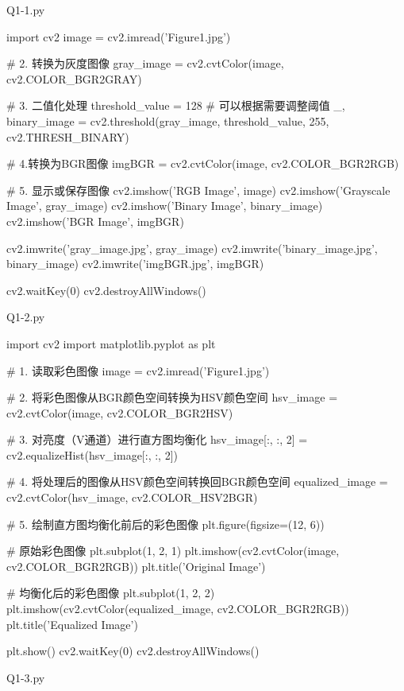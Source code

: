 \documentclass[11pt]{article}
\begin{document}
\begin{large}
    \noindent Q1-1.py
\end{large}
\begin{python}
import cv2
image = cv2.imread('Figure1.jpg')

# 2. 转换为灰度图像
gray_image = cv2.cvtColor(image, cv2.COLOR_BGR2GRAY)

# 3. 二值化处理
threshold_value = 128  # 可以根据需要调整阈值
_, binary_image = cv2.threshold(gray_image, threshold_value, 255, cv2.THRESH_BINARY)

# 4.转换为BGR图像
imgBGR = cv2.cvtColor(image, cv2.COLOR_BGR2RGB)


# 5. 显示或保存图像
cv2.imshow('RGB Image', image)
cv2.imshow('Grayscale Image', gray_image)
cv2.imshow('Binary Image', binary_image)
cv2.imshow('BGR Image', imgBGR)

cv2.imwrite('gray_image.jpg', gray_image)
cv2.imwrite('binary_image.jpg', binary_image)
cv2.imwrite('imgBGR.jpg', imgBGR)

cv2.waitKey(0)
cv2.destroyAllWindows()
\end{python}
\vspace*{1em}
\begin{large}
    \noindent Q1-2.py
\end{large}
\begin{python}
import cv2
import matplotlib.pyplot as plt

# 1. 读取彩色图像
image = cv2.imread('Figure1.jpg')

# 2. 将彩色图像从BGR颜色空间转换为HSV颜色空间
hsv_image = cv2.cvtColor(image, cv2.COLOR_BGR2HSV)

# 3. 对亮度（V通道）进行直方图均衡化
hsv_image[:, :, 2] = cv2.equalizeHist(hsv_image[:, :, 2])

# 4. 将处理后的图像从HSV颜色空间转换回BGR颜色空间
equalized_image = cv2.cvtColor(hsv_image, cv2.COLOR_HSV2BGR)

# 5. 绘制直方图均衡化前后的彩色图像
plt.figure(figsize=(12, 6))

# 原始彩色图像
plt.subplot(1, 2, 1)
plt.imshow(cv2.cvtColor(image, cv2.COLOR_BGR2RGB))
plt.title('Original Image')

# 均衡化后的彩色图像
plt.subplot(1, 2, 2)
plt.imshow(cv2.cvtColor(equalized_image, cv2.COLOR_BGR2RGB))
plt.title('Equalized Image')

plt.show()
cv2.waitKey(0)
cv2.destroyAllWindows()
\end{python}
\vspace*{1em}
\begin{large}
    \noindent Q1-3.py
\end{large}
\end{document}
